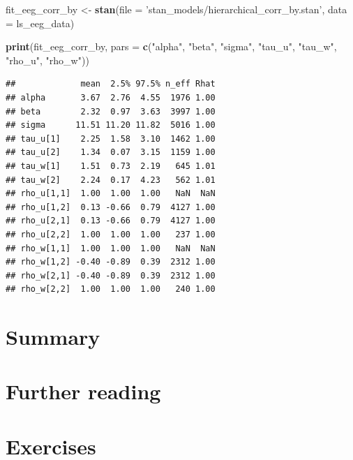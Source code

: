 \documentclass[12pt,]{krantz}
\newenvironment{Shaded}{\begin{snugshade}}{\end{snugshade}}
\newcommand{\KeywordTok}[1]{\textcolor[rgb]{0.13,0.29,0.53}{\textbf{#1}}}
\newcommand{\DataTypeTok}[1]{\textcolor[rgb]{0.13,0.29,0.53}{#1}}
\newcommand{\StringTok}[1]{\textcolor[rgb]{0.31,0.60,0.02}{#1}}
\newcommand{\NormalTok}[1]{#1}
\theoremstyle{definition}
\theoremstyle{definition}
\theoremstyle{definition}
\theoremstyle{remark}
\begin{document}
\begin{Shaded}
\begin{Highlighting}[]
\NormalTok{fit_eeg_corr_by <-}\StringTok{ }\KeywordTok{stan}\NormalTok{(}\DataTypeTok{file =} \StringTok{'stan_models/hierarchical_corr_by.stan'}\NormalTok{, }
                 \DataTypeTok{data =}\NormalTok{ ls_eeg_data)}
\end{Highlighting}
\end{Shaded}

\begin{Shaded}
\begin{Highlighting}[]
\KeywordTok{print}\NormalTok{(fit_eeg_corr_by, }\DataTypeTok{pars =}
                       \KeywordTok{c}\NormalTok{(}\StringTok{"alpha"}\NormalTok{, }\StringTok{"beta"}\NormalTok{, }\StringTok{"sigma"}\NormalTok{, }\StringTok{"tau_u"}\NormalTok{, }\StringTok{"tau_w"}\NormalTok{, }\StringTok{"rho_u"}\NormalTok{, }\StringTok{"rho_w"}\NormalTok{))}
\end{Highlighting}
\end{Shaded}

\begin{verbatim}
##             mean  2.5% 97.5% n_eff Rhat
## alpha       3.67  2.76  4.55  1976 1.00
## beta        2.32  0.97  3.63  3997 1.00
## sigma      11.51 11.20 11.82  5016 1.00
## tau_u[1]    2.25  1.58  3.10  1462 1.00
## tau_u[2]    1.34  0.07  3.15  1159 1.00
## tau_w[1]    1.51  0.73  2.19   645 1.01
## tau_w[2]    2.24  0.17  4.23   562 1.01
## rho_u[1,1]  1.00  1.00  1.00   NaN  NaN
## rho_u[1,2]  0.13 -0.66  0.79  4127 1.00
## rho_u[2,1]  0.13 -0.66  0.79  4127 1.00
## rho_u[2,2]  1.00  1.00  1.00   237 1.00
## rho_w[1,1]  1.00  1.00  1.00   NaN  NaN
## rho_w[1,2] -0.40 -0.89  0.39  2312 1.00
## rho_w[2,1] -0.40 -0.89  0.39  2312 1.00
## rho_w[2,2]  1.00  1.00  1.00   240 1.00
\end{verbatim}

\section{Summary}\label{summary-7}

\section{Further reading}\label{further-reading-9}

\section{Exercises}\label{exercises-8}
\end{document}
